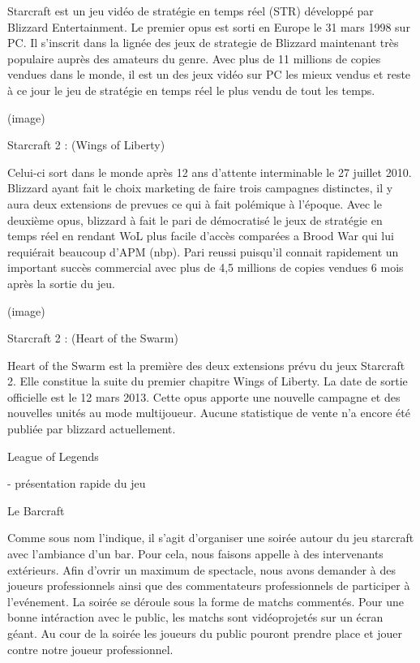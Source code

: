           Starcraft est un jeu vidéo de stratégie en temps réel (STR) développé
          par Blizzard Entertainment. Le premier opus est sorti en Europe le 31
          mars 1998 sur PC. Il s'inscrit dans la lignée des jeux de strategie de
          Blizzard maintenant très populaire auprès des amateurs du genre. Avec
          plus de 11 millions de copies vendues dans le monde, il est un des
          jeux vidéo sur PC les mieux vendus et reste à ce jour le jeu de
          stratégie en temps réel le plus vendu de tout les temps.

          (image)

        Starcraft 2 : (Wings of Liberty)

          Celui-ci sort dans le monde après 12 ans d'attente
          interminable le 27 juillet 2010. Blizzard ayant fait le choix marketing
          de faire trois campagnes distinctes, il y aura deux extensions de
          prevues ce qui à fait polémique à l'époque. Avec le deuxième opus,
          blizzard à fait le pari de démocratisé le jeux de stratégie en temps
          réel en rendant WoL plus facile d'accès comparées a Brood War qui lui
          requiérait beaucoup d'APM (nbp). Pari reussi puisqu'il connait
          rapidement un important succès commercial avec plus de 4,5 millions de
          copies vendues 6 mois après la sortie du jeu.

          (image)

        Starcraft 2 : (Heart of the Swarm)

          Heart of the Swarm est la première des deux extensions prévu
          du jeux Starcraft 2. Elle constitue la suite du premier chapitre Wings
          of Liberty. La date de sortie officielle est le 12 mars 2013. Cette opus
          apporte une nouvelle campagne et des nouvelles unités au mode
          multijoueur. Aucune statistique de vente n'a encore été publiée par
          blizzard actuellement.

        League of Legends

          - présentation rapide du jeu

	Le Barcraft

     Comme sous nom l'indique, il s'agit d'organiser une soirée autour
     du jeu starcraft avec l'ambiance d'un bar.	Pour cela, nous faisons
     appelle à des intervenants extérieurs. Afin d'ovrir un maximum de
     spectacle, nous avons demander à des joueurs professionnels ainsi
     que des commentateurs professionnels de participer à l'evénement.
     La soirée se déroule sous la forme de matchs commentés. Pour une
     bonne intéraction avec le public, les matchs sont vidéoprojetés sur
     un écran géant. Au cour de la soirée les joueurs du public pouront
     prendre place et jouer contre notre joueur professionnel.


